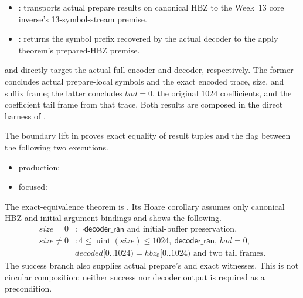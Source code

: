 \begin{itemize}
  \item {}: transports
        actual prepare results on canonical HBZ to the Week~13 core inverse's
        13-symbol-stream premise.
  \item {}: returns the symbol
        prefix recovered by the actual decoder to the apply theorem's
        prepared-HBZ premise.
\end{itemize}

 and
 directly target the actual full
encoder and decoder, respectively. The former concludes actual prepare-local
symbols and the exact encoded trace, size, and suffix frame; the latter
concludes \(bad=0\), the original 1024 coefficients, and the coefficient tail
frame from that trace. Both results are composed in the direct harness of
.

\begin{verified}
\label{thm:production-hbz-wrapper-inverse}
The boundary lift in  proves exact
equality of result tuples and the  flag between the
following two executions.
\begin{itemize}[leftmargin=2em]
  \item production: 
  \item focused: 
\end{itemize}
The exact-equivalence theorem is
. Its Hoare corollary
 assumes only canonical
HBZ and initial argument bindings and shows the following.
\[
\begin{array}{ll}
size=0 &: \neg\mathsf{decoder\_ran}\text{ and initial-buffer preservation},\\
size\ne0 &: 4\le\operatorname{uint}(size)\le1024,
\ \mathsf{decoder\_ran},\ bad=0,\\
& decoded[0..1024)=hbz_0[0..1024)\text{ and two tail frames}.
\end{array}
\]
The success branch also supplies actual prepare's
 and exact 
witnesses. This is not circular composition: neither success nor decoder output
is required as a precondition.
\end{verified}

